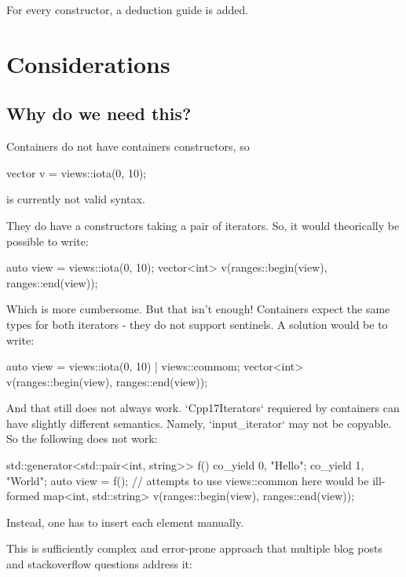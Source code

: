 \documentclass{wg21}
\begin{document}
For every constructor, a deduction guide is added.


\section{Considerations}


\subsection{Why do we need this?}

Containers do not have containers constructors, so

\begin{colorblock}
vector v = views::iota(0, 10);
\end{colorblock}

is currently not valid syntax.

They do have a constructors taking a pair of iterators.
So, it would theorically be possible to write:

\begin{colorblock}
auto view = views::iota(0, 10);
vector<int> v(ranges::begin(view), ranges::end(view));
\end{colorblock}

Which is more cumbersome. But that isn't enough! Containers expect the same types for both iterators - they do not support sentinels.
A solution would be to write:
\begin{colorblock}
auto view = views::iota(0, 10) | views::commom;
vector<int> v(ranges::begin(view), ranges::end(view));
\end{colorblock}

And that still does not always work. `Cpp17Iterators` requiered by containers can have slightly different semantics.
Namely, `input_iterator` may not be copyable. So the following does not work:

\begin{colorblock}
std::generator<std::pair<int, string>> f() {
   co_yield {0, "Hello"};
   co_yield {1, "World"};
}
auto view = f(); // attempts to use views::common here would be ill-formed
map<int, std::string> v(ranges::begin(view), ranges::end(view));
\end{colorblock}

Instead, one has to insert each element manually.

This is sufficiently complex and error-prone approach that multiple blog posts and stackoverflow questions address it:
\end{document}
